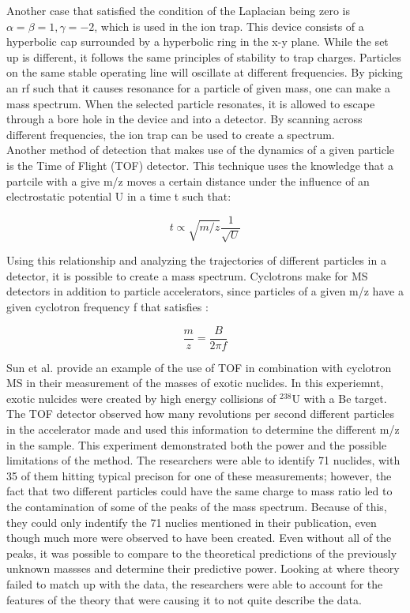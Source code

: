\documentclass[12pt]{amsart}
\begin{document}
Another case that satisfied the condition of the Laplacian being zero is $\alpha = \beta = 1, \gamma = -2$, which is used in the ion trap. This device consists of a hyperbolic cap surrounded by a hyperbolic ring in the x-y plane. While the set up is different, it follows the same principles of stability to trap charges. Particles on the same stable operating line will oscillate at different frequencies. By picking an rf such that it causes resonance for a particle of given mass, one can make a mass spectrum. When the selected particle resonates, it is allowed to escape through a bore hole in the device and into a detector. By scanning across different frequencies, the ion trap can be used to create a spectrum.\cite{paul}\\

Another method of detection that makes use of the dynamics of a given particle is the Time of Flight (TOF) detector. This technique uses the knowledge that a partcile with a give m/z moves a certain distance under the influence of an electrostatic potential U in a time t such that:

\begin{equation}
t\varpropto \sqrt{m/z}\frac{1}{\sqrt{U}}
\end{equation}

Using this relationship and analyzing the trajectories of different particles in a detector, it is possible to create a mass spectrum. Cyclotrons make for MS detectors in addition to particle accelerators, since particles of a given m/z have a given cyclotron frequency f that satisfies\cite{collo} :

\begin{equation}
\frac{m}{z} = \frac{B}{2\pi f}
\label{eq:cyc}
\end{equation}


Sun et al. provide an example of the use of TOF in combination with cyclotron MS in their measurement of the masses of exotic nuclides. In this experiemnt, exotic nulcides were created by high energy collisions of $^{238}$U with a Be target. The TOF detector observed how many revolutions per second different particles in the accelerator made and used this information to determine the different m/z in the sample. This experiment demonstrated both the power and the possible limitations of the method. The researchers were able to identify 71 nuclides, with 35 of them hitting typical precison for one of these measurements; however, the fact that two different particles could have the same charge to mass ratio led to the contamination of some of the peaks of the mass spectrum. Because of this, they could only indentify the 71 nuclies mentioned in their publication, even though much more were observed to have been created. Even without all of the peaks, it was possible to compare to the theoretical predictions of the previously unknown massses and determine their predictive power. Looking at where theory failed to match up with the data, the researchers were able to account for the features of the theory that were causing it to not quite describe the data.\cite{sun}\\
\end{document}
